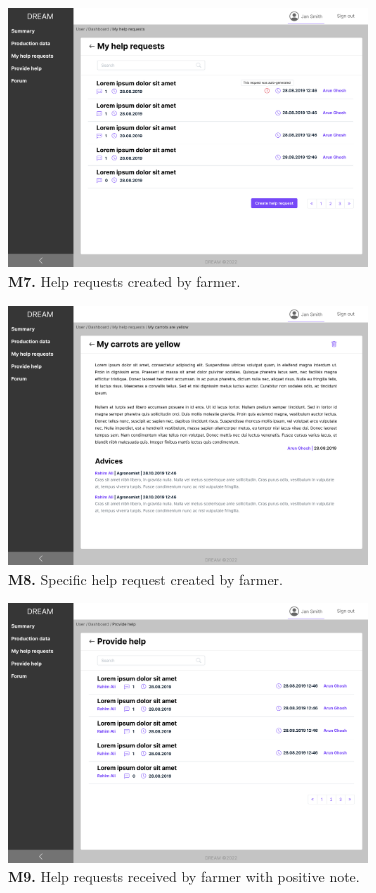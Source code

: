 \begin{figure}[H]
    \centering
    \includegraphics[width=0.85\textwidth]{mockups/Farmer_Dashboard_My help requests.png}
    \caption{\textbf{M7.} Help requests created by farmer.}
\end{figure}

\begin{figure}[H]
    \centering
    \includegraphics[width=0.85\textwidth]{mockups/Farmer_Dashboard_My help requests_VIew request.png}
    \caption{\textbf{M8.} Specific help request created by farmer.}
\end{figure}

\begin{figure}[H]
    \centering
    \includegraphics[width=0.85\textwidth]{mockups/Farmer_Dashboard_Provide help.png}
    \caption{\textbf{M9.} Help requests received by farmer with positive note.}
\end{figure}

